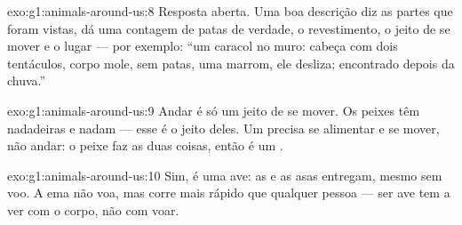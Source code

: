 \begin{solution}{exo:g1:animals-around-us:8}
Resposta aberta. Uma boa descrição diz as partes que foram vistas,
dá uma contagem de patas de verdade, o revestimento, o jeito de se
mover e o lugar --- por exemplo: ``um caracol no muro: cabeça com
dois tentáculos, corpo mole, sem patas, uma  marrom, ele
desliza; encontrado depois da chuva.''
\end{solution}

\begin{solution}{exo:g1:animals-around-us:9}
Andar é só um jeito de se mover. Os peixes têm nadadeiras e nadam
--- esse é o jeito deles. Um  precisa se alimentar e se mover,
não andar: o peixe faz as duas coisas, então é um .
\end{solution}

\begin{solution}{exo:g1:animals-around-us:10}
Sim, é uma ave: as  e as asas entregam, mesmo sem voo. A ema
não voa, mas corre mais rápido que qualquer pessoa --- ser ave tem a
ver com o corpo, não com voar.
\end{solution}
